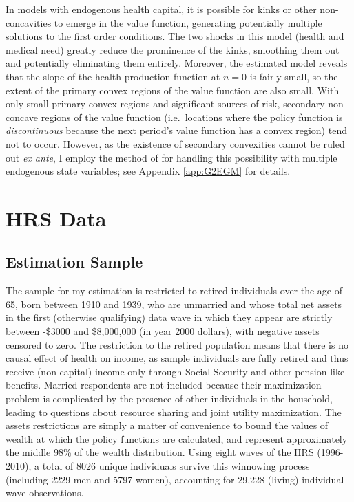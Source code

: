 \documentclass[12pt,pdftex,letterpaper]{article}
\newcommand{\Invst}{n}
\begin{document}
In models with endogenous health capital, it is possible for kinks or other non-concavities to emerge in the value function, generating potentially multiple solutions to the first order conditions.  The two shocks in this model (health and medical need) greatly reduce the prominence of the kinks, smoothing them out and potentially eliminating them entirely.  Moreover, the estimated model reveals that the slope of the health production function at $\Invst=0$ is fairly small, so the extent of the primary convex regions of the value function are also small.  With only small primary convex regions and significant sources of risk, secondary non-concave regions of the value function (i.e.\ locations where the policy function is \textit{discontinuous} because the next period's value function has a convex region) tend not to occur.  However, as the existence of secondary convexities cannot be ruled out \textit{ex ante}, I employ the method of \cite{jorgensen17} for handling this possibility with multiple endogenous state variables; see Appendix \ref{app:G2EGM} for details.



\section{HRS Data}
\label{sec:Data}

\subsection{Estimation Sample}

The sample for my estimation is restricted to retired individuals over the age of 65, born between 1910 and 1939, who are unmarried and whose total net assets in the first (otherwise qualifying) data wave in which they appear are strictly between -\$3000 and \$8,000,000 (in year 2000 dollars), with negative assets censored to zero.  The restriction to the retired population means that there is no causal effect of health on income, as sample individuals are fully retired and thus receive (non-capital) income only through Social Security and other pension-like benefits.  Married respondents are not included because their maximization problem is complicated by the presence of other individuals in the household, leading to questions about resource sharing and joint utility maximization.  The assets restrictions are simply a matter of convenience to bound the values of wealth at which the policy functions are calculated, and represent approximately the middle 98\% of the wealth distribution.  Using eight waves of the HRS (1996-2010), a total of 8026 unique individuals survive this winnowing process (including 2229 men and 5797 women), accounting for 29,228 (living) individual-wave observations.
\end{document}
